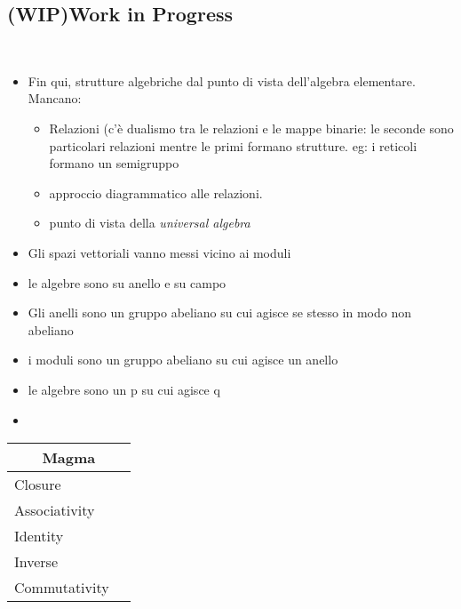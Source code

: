 \documentclass[a4paper,12pt]{scrartcl}    %
\begin{document}
\begin{landscape}
\begin{minipage}[c][\textheight]{0.30 \linewidth}
	    \section{(WIP)Work in Progress}
	    \mbox{}\\
		\begin{itemize}
			\item Fin qui, strutture algebriche dal punto di vista dell'algebra elementare. Mancano:
				\begin{itemize}
					\item Relazioni (c'è dualismo tra le relazioni e le mappe binarie: le seconde sono particolari relazioni mentre le primi formano strutture. eg: i reticoli formano un semigruppo
					\item approccio diagrammatico alle relazioni.
					\item punto di vista della \emph{universal algebra}
				\end{itemize}
			\item Gli spazi vettoriali vanno messi vicino ai moduli
			\item le algebre sono su anello e su campo
			\item Gli anelli sono un gruppo abeliano su cui agisce se stesso in modo non abeliano
			\item i moduli sono un gruppo abeliano su cui agisce un anello
			\item le algebre sono un p su cui agisce q
			\item 
		\end{itemize}	
	\end{minipage}
	\hspace{1cm}
	\begin{minipage}[t][]{0.60 \linewidth}
		\begin{minipage}[c]{0,5\textwidth}	
			\begin{tabular}{|l|p{2cm}|} %
			  \hline
			  \multicolumn{2}{c}{\cellcolor{yellow!25}Magma} \\
			  \hline
			   \cellcolor{blue!25} Closure&  \\
			    \cellcolor{red!25} Associativity&  \\
			    \cellcolor{red!25} Identity&  \\
			    \cellcolor{red!25} Inverse&  \\
			    \cellcolor{red!25} Commutativity&  \\
			  \hline
			\end{tabular}
			\vfill
			\begin{tabular}{|l|p{2cm}|} %

\end{tabular}
\end{minipage}
\end{minipage}
\end{landscape}
\end{document}
